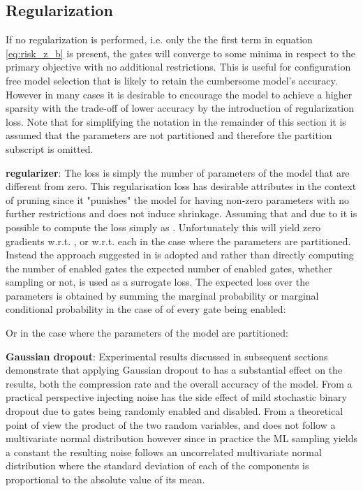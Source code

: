 \documentclass[final,1p,times]{elsarticle}
\begin{document}
\subsection{Regularization}
If no regularization is performed, i.e. only the the first term in equation \eqref{eq:risk_z_b} is present, the gates will converge to some minima in respect to the primary objective with no additional restrictions. This is useful for configuration free model selection that is likely to retain the cumbersome model's accuracy. However in many cases it is desirable to encourage the model to achieve a higher sparsity with the trade-off of lower accuracy by the introduction of regularization loss. Note that for simplifying the notation in the remainder of this section it is assumed that the parameters are not partitioned and therefore the partition subscript is omitted. \newline

\textbf{ regularizer}: The  loss is simply the number of parameters of the model that are different from zero. This regularisation loss has desirable attributes in the context of pruning since it "punishes" the model for having non-zero parameters with no further restrictions and does not induce shrinkage. Assuming that  and due to  it is possible to compute the  loss simply as . Unfortunately this will yield zero gradients w.r.t. , or w.r.t. each  in the case where the parameters are partitioned. Instead the approach suggested in \cite{louizos2018learning} is adopted and rather than directly computing the number of enabled gates the expected number of enabled gates, whether sampling or not, is used as a surrogate loss. The expected  loss over the parameters is obtained by summing the marginal probability or marginal conditional probability in the case of  of every gate being enabled:



Or in the case where the parameters of the model are partitioned:



\textbf{Gaussian dropout}: Experimental results discussed in subsequent sections demonstrate that applying Gaussian dropout \cite{10.5555/2627435.2670313} to  has a substantial effect on the results, both the compression rate and the overall accuracy of the model. From a practical perspective injecting noise has the side effect of mild stochastic binary dropout due to gates being randomly enabled and disabled. From a theoretical point of view the product of the two random variables,  and  does not follow a multivariate normal distribution however since in practice the ML sampling yields a constant  the resulting noise follows an uncorrelated multivariate normal distribution where the standard deviation of each of the components is proportional to the absolute value of its mean.
\end{document}
